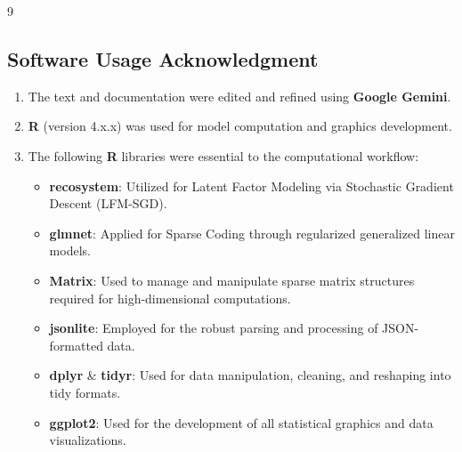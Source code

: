 \documentclass[conference]{IEEEtran}
\begin{document}
\begin{thebibliography}{9}
\subsection*{Software Usage Acknowledgment}
\begin{enumerate}
	\item The text and documentation were edited and refined using \textbf{Google Gemini}.
	\item \textbf{R} (version 4.x.x) was used for model computation and graphics development.
	\item The following \textbf{R} libraries were essential to the computational workflow:
	\begin{itemize}
		\item \textbf{recosystem}: Utilized for Latent Factor Modeling via Stochastic Gradient Descent (LFM-SGD).
		\item \textbf{glmnet}: Applied for Sparse Coding through regularized generalized linear models.
		\item \textbf{Matrix}: Used to manage and manipulate sparse matrix structures required for high-dimensional computations.
		\item \textbf{jsonlite}: Employed for the robust parsing and processing of JSON-formatted data.
		\item \textbf{dplyr} \& \textbf{tidyr}: Used for data manipulation, cleaning, and reshaping into tidy formats.
		\item \textbf{ggplot2}: Used for the development of all statistical graphics and data visualizations.
	\end{itemize}
\end{enumerate}

	
\end{thebibliography}

\vspace{12pt}
\end{document}
